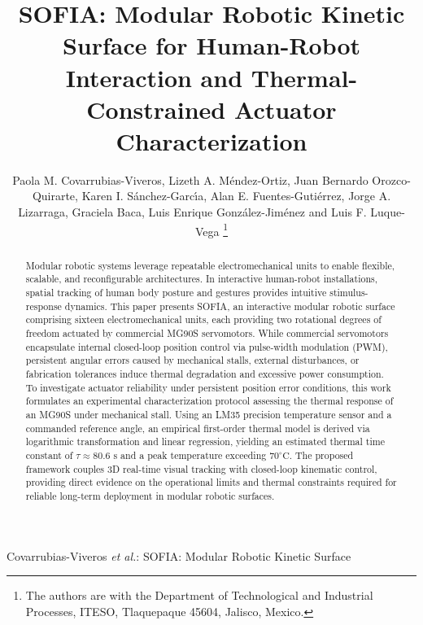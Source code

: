 \documentclass[lettersize,journal]{IEEEtran}
\begin{document}
\title{SOFIA: Modular Robotic Kinetic Surface for Human-Robot Interaction and Thermal-Constrained Actuator Characterization}

\author{Paola M. Covarrubias-Viveros, Lizeth A. M{\'e}ndez-Ortiz, Juan Bernardo Orozco-Quirarte, Karen I. S{\'a}nchez-Garc{\'\i}a, Alan E. Fuentes-Guti{\'e}rrez, Jorge A. Lizarraga, Graciela Baca, Luis Enrique Gonz{\'a}lez-Jim{\'e}nez and Luis F. Luque-Vega
\thanks{The authors are with the Department of Technological and
Industrial Processes, ITESO, Tlaquepaque 45604, Jalisco, Mexico.}}

%
{Covarrubias-Viveros \MakeLowercase{\textit{et al.}}: SOFIA: Modular Robotic Kinetic Surface}

\maketitle

\begin{abstract}
Modular robotic systems leverage repeatable electromechanical units to enable flexible, scalable, and reconfigurable architectures. In interactive human-robot installations, spatial tracking of human body posture and gestures provides intuitive stimulus-response dynamics. This paper presents SOFIA, an interactive modular robotic surface comprising sixteen electromechanical units, each providing two rotational degrees of freedom actuated by commercial MG90S servomotors. While commercial servomotors encapsulate internal closed-loop position control via pulse-width modulation (PWM), persistent angular errors caused by mechanical stalls, external disturbances, or fabrication tolerances induce thermal degradation and excessive power consumption. To investigate actuator reliability under persistent position error conditions, this work formulates an experimental characterization protocol assessing the thermal response of an MG90S under mechanical stall. Using an LM35 precision temperature sensor and a commanded reference angle, an empirical first-order thermal model is derived via logarithmic transformation and linear regression, yielding an estimated thermal time constant of $\tau \approx 80.6\text{ s}$ and a peak temperature exceeding $70^\circ\text{C}$. The proposed framework couples 3D real-time visual tracking with closed-loop kinematic control, providing direct evidence on the operational limits and thermal constraints required for reliable long-term deployment in modular robotic surfaces.
\end{abstract}
\end{document}
